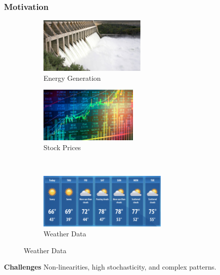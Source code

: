 \documentclass[spanish]{beamer}
\begin{document}
	
	
\frame{\titlepage}

\begin{frame}
	\frametitle{Motivation}
	\begin{figure}[htbp]
		\centering
		\begin{subfigure}[t]{0.48\textwidth}
			\centering
			\includegraphics[width=\linewidth,height=2.7cm,keepaspectratio]{figures/hydro_gen.jpeg}
			\caption{Energy Generation}
		\end{subfigure}
		\hfill
		\begin{subfigure}[t]{0.48\textwidth}
			\centering
			\includegraphics[width=\linewidth,height=2.7cm,keepaspectratio]{figures/stock_prices.jpg}
			\caption{Stock Prices}
		\end{subfigure}
		\\[1ex] %
		\begin{subfigure}[t]{0.48\textwidth}
			\centering
			\includegraphics[width=\linewidth,height=2.7cm,keepaspectratio]{figures/weather_data.png}
			\caption{Weather Data}
		\end{subfigure}
	\end{figure}
	
	\begin{block}{\textbf{Challenges}}
		Non-linearities, high stochasticity, and complex patterns.
	\end{block}
	
\end{frame}
\end{document}
